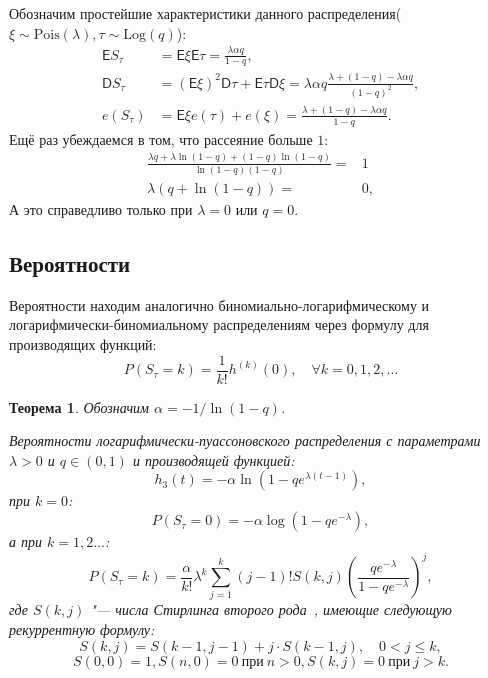 \documentclass[12pt, specialist, subf, substylefile = spbu_report.rtx]{disser}
\newtheorem{theorem}{Теорема}
\begin{document}
	Обозначим простейшие характеристики данного распределения($ \xi \sim \mathrm{Pois}(\lambda), \tau \sim \mathrm{Log}(q) $):
	\[
	\begin{aligned}
		\mathsf{E} S _\tau &= \mathsf{E} \xi \mathsf{E} \tau = \frac {\lambda \alpha q} {1 - q},\\
		\mathsf{D} S _\tau &= \left( \mathsf{E} \xi \right) ^2 \mathsf{D} \tau + \mathsf{E} \tau \mathsf{D} \xi = \lambda \alpha q \frac {\lambda + (1 - q) - \lambda \alpha q} {(1 - q) ^2},\\
		e (S _\tau) &= \mathsf{E} \xi e (\tau) + e (\xi) = \frac {\lambda + (1 - q) - \lambda \alpha q} {1 - q}.
	\end{aligned}
	\]
	Ещё раз убеждаемся в том, что рассеяние больше $1$:
	\[
		\begin{aligned}
			\frac {\lambda q + \lambda \ln (1 - q) + (1 - q) \ln(1 - q)} {\ln(1 - q) (1 - q)} =& 1\\
			\lambda (q + \ln (1 - q)) =& 0,
		\end{aligned}
	\]
	А это справедливо только при $\lambda = 0$ или $q = 0$.
	
	\subsection{Вероятности}
	
	Вероятности находим аналогично биномиально-логарифмическому и логарифмически-биномиальному распределениям через формулу для производящих функций:
	\[ P(S _\tau = k) = \frac {1} {k!} h ^{(k)} (0), \quad \forall k = 0, 1, 2, \dots \]

	\begin{theorem}
		\label{theorem:probLPR1}
		Обозначим $\alpha = -1 / \ln(1 - q)$.
		
		Вероятности логарифмически-пуассоновского распределения с параметрами $\lambda > 0$ и $q \in (0, 1)$ и производящей функцией:
		\[
		h _3 (t) = -\alpha \ln \left(1 - q e ^{\lambda (t - 1)}\right),
		\]
		при $k = 0$:
		\[
			P(S _\tau = 0) = -\alpha \log\left(1 - q e ^{-\lambda}\right),
		\]
		а при $k = 1, 2 \dots$:
		\begin{equation}\label{lpr:prob1}
			P(S _\tau = k) = \frac \alpha {k !} \lambda ^k \sum \limits _{j = 1} ^{k} (j - 1)! S(k, j) \left(\frac {q e ^{-\lambda}} {1 - q e ^{-\lambda}}\right) ^j,
		\end{equation}
		где $S(k, j)$ "--- числа Стирлинга второго рода~\cite{bib:knuth1998}, имеющие следующую рекуррентную формулу:
		\[
			S(k, j) = S(k - 1, j - 1) + j \cdot S(k - 1, j), \quad 0 < j \leqslant k,
		\]
		\[
			S(0, 0) = 1, S(n, 0) = 0~ \text{при}~ n > 0, S(k, j) = 0~ \text{при}~ j > k.
		\]
	\end{theorem}
\end{document}
